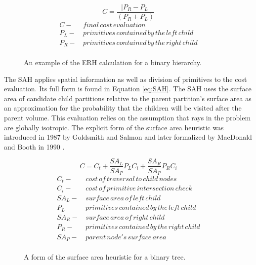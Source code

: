 \begin{figure}[H]
\begin{equation}
\label{eq:ERH}
 C = \frac{|P_{R}-P_{L}|}{(P_{R} + P_{L})}
\end{equation}
  \begin{align*}
    C - & \,final \, cost \, evaluation \\
    P_{L} - & \, primitives\, contained\, by\, the\, left\, child  \\
    P_{R} - & \, primitives\, contained\, by\, the\, right\, child \\
  \end{align*}
  \caption[Formulation of the entity ratio heuristic.]{An example of the ERH calculation for a binary hierarchy.}
  \label{fig:ERH}
\end{figure}

The SAH applies spatial information as well as division of primitives to the
cost evaluation. Its full form is found in Equation \eqref{eq:SAH}. The SAH uses
the surface area of candidate child partitions relative to the parent
partition's surface area as an approximation for the probability that the children
will be visited after the parent volume. This evaluation relies on the
assumption that rays in the problem are globally isotropic. The explicit form of
the surface area heuristic was introduced in 1987 by Goldsmith and Salmon
\cite{Goldsmith_1987} and later formalized by MacDonald and Booth in 1990
\cite{MacDonald_1990}.

\begin{figure}[H]
  \begin{equation}
    C =  C_{t} + \frac{SA_{L}}{SA_{P}}P_{L}C_{i} +  \frac{SA_{R}}{SA_{P}}P_{R}C_{i}
    \label{eq:SAH}
  \end{equation}
  \begin{align*}
    C_{t} - & \,cost\, of\, traversal\, to\, child\, nodes \\
    C_{i} - & \, cost\, of\, primitive\, intersection\, check\, \\
    SA_{L} - &  \,surface\, area\, of\, left\, child \\
    P_{L} - & \, primitives\, contained\, by\, the\, left\, child  \\
    SA_{R} - & \, surface\, area\, of\, right\, child \\
    P_{R} - & \, primitives\, contained\, by\, the\, right\, child \\
    SA_{P} - & \, parent\, node's \, surface \, area \\
  \end{align*}
  \caption[Formulation of the surface area heuristic.]{A form of the surface area heuristic for a binary tree.}
  \label{fig:SAH}
\end{figure}

